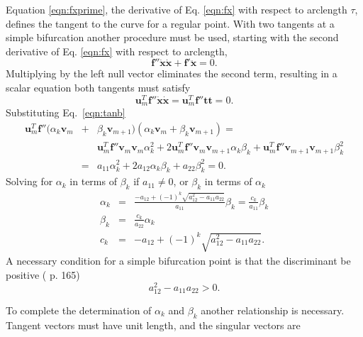 \documentclass[11pt,openany,twoside]{book}
\numberwithin{equation}{section}		%
\newcommand{\Vector}[1]{\boldsymbol{#1}}
\newcommand{\Eqn}[1]{Eq.\ \ref{#1}}  %
\begin{document}
\par
Equation \ref{eqn:fxprime}, the derivative of Eq. \ref{eqn:fx} with respect
to arclength $\tau$,
defines the tangent to the curve for a regular
point.
With two tangents at a simple bifurcation another procedure must
be used, starting with the
second derivative of Eq. \ref{eqn:fx}
with respect to arclength,
\begin{equation}
\label{eqn:secondder}
\Vector{f}''\dot{\Vector{x}}\dot{\Vector{x}} + \Vector{f}'\ddot{\Vector{x}} = 0.
\end{equation}
Multiplying
by the left null vector eliminates the second term,
resulting in a scalar equation both tangents must satisfy
\begin{equation}
\Vector{u}_m^T\Vector{f}''\dot{\Vector{x}}\dot{\Vector{x}} =
	\Vector{u}_m^T\Vector{f}''\Vector{t}\Vector{t} = 0.
\end{equation}
Substituting \Eqn{eqn:tanb}
\begin{eqnarray}
\Vector{u}_m^T\Vector{f}'' (\alpha_k\Vector{v}_m &+& \beta_k\Vector{v}_{m+1}) (\alpha_k\Vector{v}_m + \beta_k\Vector{v}_{m+1}) = \nonumber \\
 &     & \Vector{u}_m^T\Vector{f}''\Vector{v}_m\Vector{v}_m \alpha_k^2 + 2\Vector{u}_m^T\Vector{f}''\Vector{v}_m\Vector{v}_{m+1}\alpha_k\beta_k + \Vector{u}_m^T\Vector{f}''\Vector{v}_{m+1}\Vector{v}_{m+1}\beta_k^2 \nonumber \\
    &=& a_{11} \alpha_k^2 + 2a_{12}\alpha_k\beta_k + a_{22}\beta_k^2 = 0.
\end{eqnarray}
Solving for $\alpha_k$ in terms of $\beta_k$ if $a_{11} \ne 0$,
or $\beta_k$ in terms of $\alpha_k$
\begin{eqnarray}
\label{eqn:alpha}
 \alpha_k &=& \frac{-a_{12} + (-1)^k\sqrt{a_{12}^2 - a_{11} a_{22}}}{a_{11}} \beta_k
 = \frac{c_k}{a_{11}} \beta_k  \nonumber \\
 \beta_k &=& \frac{c_k}{a_{22}} \alpha_k \nonumber \\
 c_k &=& -a_{12} + (-1)^k \sqrt{a_{12}^2 - a_{11} a_{22}}.
\end{eqnarray}
A necessary condition for a simple bifurcation point
is that the discriminant be positive (\cite{seydel1988equilibrium} p. 165)
\begin{equation}
\label{eqn:discriminant}
a_{12}^2 - a_{11}a_{22} > 0.
\end{equation}
\par
To complete the determination of $\alpha_k$ and $\beta_k$ another relationship is
necessary.
Tangent vectors must have unit length, and the singular vectors are
\end{document}
